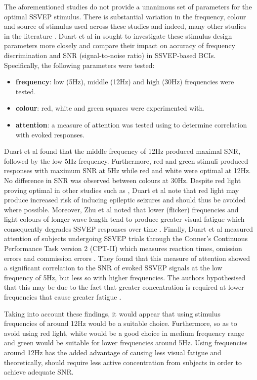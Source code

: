The aforementioned studies do not provide a unanimous set of parameters for the optimal SSVEP stimulus. There is substantial variation in the frequency, colour and source of stimulus used across these studies and indeed, many other studies in the literature \cite{duart-comparing-ssvep-stimuli}. Duart et al in \cite{duart-comparing-ssvep-stimuli} sought to investigate these stimulus design parameters more closely and compare their impact on accuracy of frequency discrimination and SNR (signal-to-noise ratio) in SSVEP-based BCIs. Specifically, the following parameters were tested:
\begin{itemize}
    \item \textbf{frequency}: low (5Hz), middle (12Hz) and high (30Hz) frequencies were tested.
    \item \textbf{colour}: red, white and green squares were experimented with. 
    \item \textbf{attention}: a measure of attention was tested using to determine correlation with evoked responses.
\end{itemize}
Duart et al found that the middle frequency of 12Hz produced maximal SNR, followed by the low 5Hz frequency. Furthermore, red and green stimuli produced responses with maximum SNR at 5Hz while red and white were optimal at 12Hz. No difference in SNR was observed between colours at 30Hz. Despite red light proving optimal in other studies such as \cite{chu-ssvep-colours}, Duart et al note that red light may produce increased risk of inducing epileptic seizures and should thus be avoided where possible. Moreover, Zhu et al noted that lower (flicker) frequencies and light colours of longer wave length tend to produce greater visual fatigue which consequently degrades SSVEP responses over time \cite{zhu2010survey}. Finally, Duart et al measured attention of subjects undergoing SSVEP trials through the Conner's Continuous Performance Task version 2 (CPT-II) which measures reaction times, omission errors and commission errors \cite{duart-comparing-ssvep-stimuli}. They found that this measure of attention showed a significant correlation to the SNR of evoked SSVEP signals at the low frequency of 5Hz, but less so with higher frequencies. The authors hypothesised that this may be due to the fact that greater concentration is required at lower frequencies that cause greater fatigue \cite{duart-comparing-ssvep-stimuli}.

Taking into account these findings, it would appear that using stimulus frequencies of around 12Hz would be a suitable choice. Furthermore, so as to avoid using red light, white would be a good choice in medium frequency range and green would be suitable for lower frequencies around 5Hz. Using frequencies around 12Hz has the added advantage of causing less visual fatigue and theoretically, should require less active concentration from subjects in order to achieve adequate SNR.

